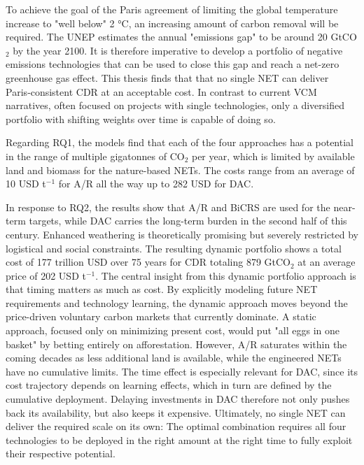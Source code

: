 To achieve the goal of the Paris agreement of limiting the global temperature increase to "well below" 2 °C, an increasing amount of carbon removal will be required. The UNEP estimates the annual "emissions gap" to be around 20 GtCO$_2$ by the year 2100. It is therefore imperative to develop a portfolio of negative emissions technologies that can be used to close this gap and reach a net-zero greenhouse gas effect. This thesis finds that that no single NET can deliver Paris‑consistent CDR at an acceptable cost. In contrast to current VCM narratives, often focused on projects with single technologies, only a diversified portfolio with shifting weights over time is capable of doing so.\vspace{2mm}

Regarding RQ1, the models find that each of the four approaches has a potential in the range of multiple gigatonnes of CO$_2$ per year, which is limited by available land and biomass for the nature-based NETs. The costs range from an average of 10 USD t$^{-1}$ for A/R all the way up to 282 USD for DAC.\vspace{2mm}

In response to RQ2, the results show that A/R and BiCRS are used for the near-term targets, while DAC carries the long-term burden in the second half of this century. Enhanced weathering is theoretically promising but severely restricted by logistical and social constraints. The resulting dynamic portfolio shows a total cost of 177 trillion USD over 75 years for CDR totaling 879 GtCO$_2$ at an average price of 202 USD t$^{-1}$. The central insight from this dynamic portfolio approach is that timing matters as much as cost. By explicitly modeling future NET requirements and technology learning, the dynamic approach moves beyond the price-driven voluntary carbon markets that currently dominate. A static approach, focused only on minimizing present cost, would put "all eggs in one basket" by betting entirely on afforestation. However, A/R saturates within the coming decades as less additional land is available, while the engineered NETs have no cumulative limits. The time effect is especially relevant for DAC, since its cost trajectory depends on learning effects, which in turn are defined by the cumulative deployment. Delaying investments in DAC therefore not only pushes back its availability, but also keeps it expensive. Ultimately, no single NET can deliver the required scale on its own: The optimal combination requires all four technologies to be deployed in the right amount at the right time to fully exploit their respective potential.\vspace{2mm}

